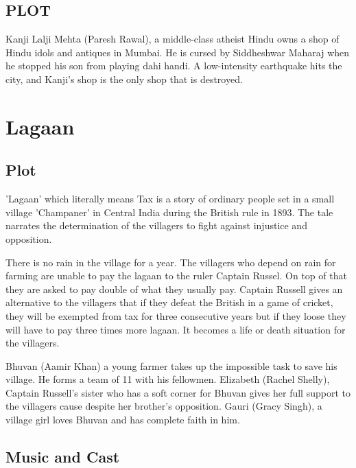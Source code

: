 \documentclass[a4paper]{article}
\begin{document}
	   
	
	   
	
	
	  
	  
	
	\subsection{PLOT}
Kanji Lalji Mehta (Paresh Rawal), a middle-class atheist Hindu owns a shop of Hindu idols and antiques in Mumbai. He is cursed by Siddheshwar Maharaj when he stopped his son from playing dahi handi. A low-intensity earthquake hits the city, and Kanji's shop is the only shop that is destroyed.	
	
	
	
	  \section{Lagaan }
	  
	  \subsection{Plot}
	  
	  'Lagaan' which literally means Tax is a story of ordinary people set in a small village 'Champaner' in Central India during the British rule in 1893. The tale narrates the determination of the villagers to fight against injustice and opposition.
	  
	  There is no rain in the village for a year. The villagers who depend on rain for farming are unable to pay the lagaan to the ruler Captain Russel. On top of that they are asked to pay double of what they usually pay. Captain Russell gives an alternative to the villagers that if they defeat the British in a game of cricket, they will be exempted from tax for three consecutive years but if they loose they will have to pay three times more lagaan. It becomes a life or death situation for the villagers.


	  
	  Bhuvan (Aamir Khan) a young farmer takes up the impossible task to save his village. He forms a team of 11 with his fellowmen. Elizabeth (Rachel Shelly), Captain Russell's sister who has a soft corner for Bhuvan gives her full support to the villagers cause despite her brother's opposition. Gauri (Gracy Singh), a village girl loves Bhuvan and has complete faith in him.

\subsection{Music and Cast}
\end{document}
